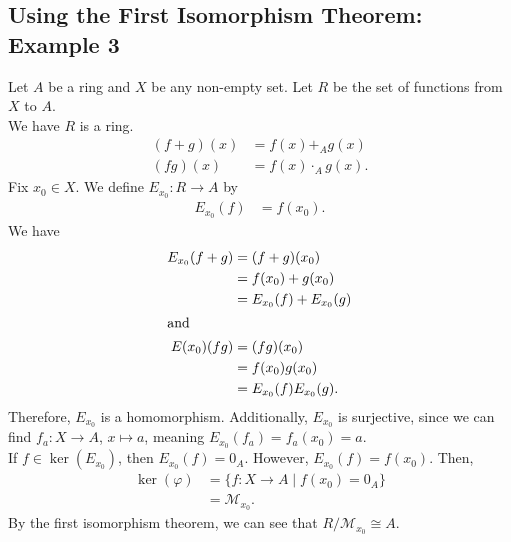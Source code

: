 \documentclass[10pt]{extarticle}
\begin{document}
  \subsection{Using the First Isomorphism Theorem: Example 3}%
  Let $A$ be a ring and $X$ be any non-empty set. Let $R$ be the set of functions from $X$ to $A$.\\

  We have $R$ is a ring.
  \begin{align*}
    (f+g)(x) &= f(x) +_{A} g(x)\\
    (fg)(x) &= f(x)\cdot_{A}g(x).
  \end{align*}
  Fix $x_0 \in X$. We define $E_{x_0}: R\rightarrow A$ by
  \begin{align*}
    E_{x_0}(f) &= f(x_0).
  \end{align*}
  We have
  \begin{align*}
    E_{x_0}(f+g) &= (f+g)(x_0)\\
                 &= f(x_0) + g(x_0)\\
                 &= E_{x_0}(f) + E_{x_0}(g)\\
                 \intertext{and}
    E(x_0)(fg) &= (fg)(x_0)\\
               &= f(x_0)g(x_0)\\
               &= E_{x_0}(f)E_{x_0}(g).
  \end{align*}
  Therefore, $E_{x_0}$ is a homomorphism. Additionally, $E_{x_0}$ is surjective, since we can find $f_a: X\rightarrow A$, $x\mapsto a$, meaning $E_{x_0}(f_a) = f_a(x_0) = a$.\\

  If $f\in \ker(E_{x_0})$, then $E_{x_0}(f) = 0_A$. However, $E_{x_0}(f) = f(x_0)$. Then,
  \begin{align*}
    \ker(\varphi) &= \{f: X\rightarrow A \mid f(x_0) = 0_A\}\\
                  &= \mathcal{M}_{x_0}.
  \end{align*}
  By the first isomorphism theorem, we can see that $R/\mathcal{M}_{x_0} \cong A$.
\end{document}
